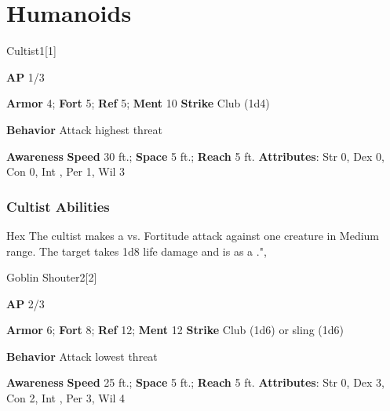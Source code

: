 \section{Humanoids}
\begin{monsection}{Cultist}{1}[1]
\vspace{-1em}\vspace{-1em}
\begin{spellcontent}
\begin{spelltargetinginfo}
{\textbf{AP} 1/3}

\pari \textbf{Armor} 4;
\textbf{Fort} 5;
\textbf{Ref} 5;
\textbf{Ment} 10
\pari \textbf{Strike} Club  (1d4)



\pari \textbf{Behavior} Attack highest threat
\end{spelltargetinginfo}
\end{spellcontent}

\begin{monsterfooter}
\pari \textbf{Awareness} 
\pari \textbf{Speed} 30 ft.;
\textbf{Space} 5 ft.;
\textbf{Reach} 5 ft.
\pari \textbf{Attributes}:
Str 0,
Dex 0,
Con 0,
Int ,
Per 1,
Wil 3
\end{monsterfooter}
\end{monsection}


\subsubsection{Cultist Abilities}

\begin{freeability}{Hex}
The cultist makes a  vs. Fortitude attack against one creature in Medium range.
\hit The target takes 1d8 life damage and is  as a .",
\end{freeability}

\begin{monsection}{Goblin Shouter}{2}[2]
\vspace{-1em}\vspace{-1em}
\begin{spellcontent}
\begin{spelltargetinginfo}
{\textbf{AP} 2/3}

\pari \textbf{Armor} 6;
\textbf{Fort} 8;
\textbf{Ref} 12;
\textbf{Ment} 12
\pari \textbf{Strike} Club  (1d6) or sling  (1d6)



\pari \textbf{Behavior} Attack lowest threat
\end{spelltargetinginfo}
\end{spellcontent}

\begin{monsterfooter}
\pari \textbf{Awareness} 
\pari \textbf{Speed} 25 ft.;
\textbf{Space} 5 ft.;
\textbf{Reach} 5 ft.
\pari \textbf{Attributes}:
Str 0,
Dex 3,
Con 2,
Int ,
Per 3,
Wil 4
\end{monsterfooter}
\end{monsection}


